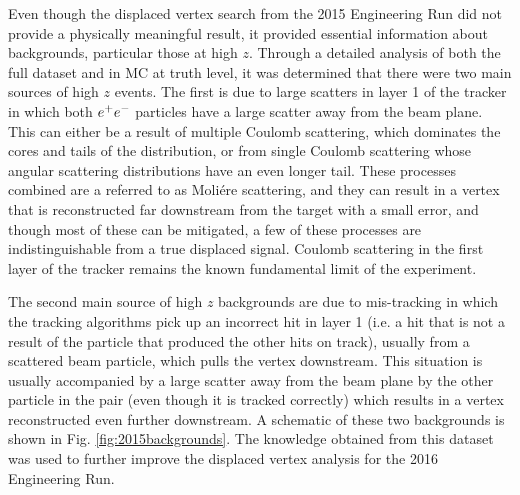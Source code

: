 Even though the displaced vertex search from the 2015 Engineering Run did not provide a physically meaningful result, it provided essential information about backgrounds, particular those at high $z$. Through a detailed analysis of both the full dataset and in MC at truth level, it was determined that there were two main sources of high $z$ events. The first is due to large scatters in layer 1 of the tracker in which both $e^{+}e^{-}$ particles have a large scatter away from the beam plane. This can either be a result of multiple Coulomb scattering, which dominates the cores and tails of the distribution, or from single Coulomb scattering whose angular scattering distributions have an even longer tail. These processes combined are a referred to as Moli\'ere scattering, and they can result in a vertex that is reconstructed far downstream from the target with a small error, and though most of these can be mitigated, a few of these processes are indistinguishable from a true displaced signal. Coulomb scattering in the first layer of the tracker remains the known fundamental limit of the experiment. 

The second main source of high $z$ backgrounds are due to mis-tracking in which the tracking algorithms pick up an incorrect hit in layer 1 (i.e. a hit that is not a result of the particle that produced the other hits on track), usually from a scattered beam particle, which pulls the vertex downstream. This situation is usually accompanied by a large scatter away from the beam plane by the other particle in the pair (even though it is tracked correctly) which results in a vertex reconstructed even further downstream. A schematic of these two backgrounds is shown in Fig. \ref{fig:2015backgrounds}. The knowledge obtained from this dataset was used to further improve the displaced vertex analysis for the 2016 Engineering Run.


